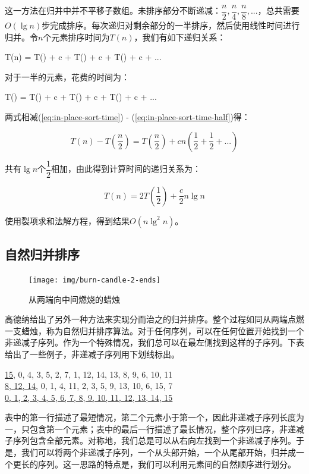 \documentclass[b5paper]{ctexart}
\begin{document}
这一方法在归并中并不平移子数组。未排序部分不断递减：$\dfrac{n}{2}, \dfrac{n}{4}, \dfrac{n}{8}, ...$，总共需要$O(\lg n)$步完成排序。每次递归对剩余部分的一半排序，然后使用线性时间进行归并。令$n$个元素排序时间为$T(n)$，我们有如下递归关系：

\be
T(n) = T() + c  + T() + c  + T() + c  + ...
\label{eq:in-place-sort-time}
\ee

对于一半的元素，花费的时间为：

\be
T() = T() + c  + T() + c  + T() + c  + ...
\label{eq:in-place-sort-time-half}
\ee

两式相减(\cref{eq:in-place-sort-time}) - (\cref{eq:in-place-sort-time-half})得：

\[
T(n) - T(\frac{n}{2}) = T(\frac{n}{2}) + c n (\frac{1}{2} + \frac{1}{2} + ... )
\]

共有$\lg n$个$\dfrac{1}{2}$相加，由此得到计算时间的递归关系为：

\[
T(n) = 2 T(\frac{1}{2}) + \frac{c}{2} n \lg n
\]

使用裂项求和法解方程，得到结果$O(n \lg^2 n)$。

\subsection{自然归并排序}

\begin{figure}[htbp]
 \centering
 \texttt{[image: img/burn-candle-2-ends]}
 \caption{从两端向中间燃烧的蜡烛}
 \label{fig:burn-candle}
\end{figure}

高德纳给出了另外一种方法来实现分而治之的归并排序。整个过程如同从两端点燃一支蜡烛\cite{TAOCP}，称为自然归并排序算法。对于任何序列，可以在任何位置开始找到一个非递减子序列。作为一个特殊情况，我们总可以在最左侧找到这样的子序列。下表给出了一些例子，非递减子序列用下划线标出。

\underline{15}, 0, 4, 3, 5, 2, 7, 1, 12, 14, 13, 8, 9, 6, 10, 11 \\
\underline{8, 12, 14}, 0, 1, 4, 11, 2, 3, 5, 9, 13, 10, 6, 15, 7 \\
\underline{0, 1, 2, 3, 4, 5, 6, 7, 8, 9, 10, 11, 12, 13, 14, 15} \\
\etab

表中的第一行描述了最短情况，第二个元素小于第一个，因此非递减子序列长度为一，只包含第一个元素；表中的最后一行描述了最长情况，整个序列已序，非递减子序列包含全部元素。对称地，我们总是可以从右向左找到一个非递减子序列。于是，我们可以将两个非递减子序列，一个从头部开始，一个从尾部开始，归并成一个更长的序列。这一思路的特点是，我们可以利用元素间的自然顺序进行划分。
\end{document}
